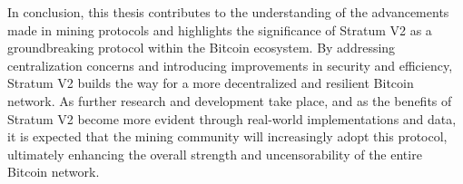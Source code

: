 \noindent In conclusion, this thesis contributes to the understanding of the advancements made in mining protocols and highlights the significance of Stratum V2 as a groundbreaking protocol within the Bitcoin ecosystem. By addressing centralization concerns and introducing improvements in security and efficiency, Stratum V2 builds the way for a more decentralized and resilient Bitcoin network. As further research and development take place, and as the benefits of Stratum V2 become more evident through real-world implementations and data, it is expected that the mining community will increasingly adopt this protocol, ultimately enhancing the overall strength and uncensorability of the entire Bitcoin network.